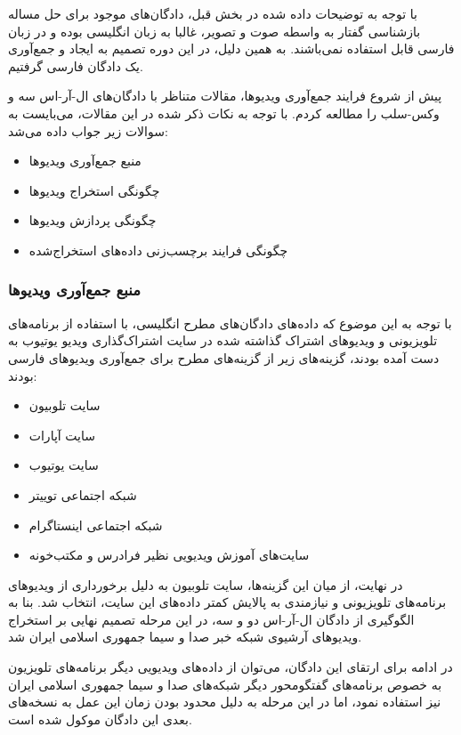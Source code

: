 با توجه به توضیحات داده شده در بخش قبل، دادگان‌های موجود برای حل مساله بازشناسی گفتار به واسطه صوت و تصویر، غالبا به زبان انگلیسی بوده و در زبان فارسی قابل استفاده نمی‌باشند. به همین دلیل، در این دوره تصمیم به ایجاد و جمع‌آوری یک دادگان فارسی گرفتیم.

پیش از شروع فرایند جمع‌آوری ویدیو‌ها، مقالات متناظر با دادگان‌های ال-آر-اس سه و وکس-سلب را مطالعه کردم. با توجه به نکات ذکر شده در این مقالات، می‌بایست به سوالات زیر جواب داده می‌شد:

\begin{itemize}
	\item منبع جمع‌آوری ویدیو‌ها
	\item چگونگی استخراج ویدیو‌ها
	\item چگونگی پردازش ویدیو‌ها
	\item چگونگی فرایند برچسب‌زنی داده‌های استخراج‌شده
\end{itemize}

\subsubsection{منبع جمع‌آوری ویدیو‌ها}

با توجه به این موضوع که داده‌های دادگان‌های مطرح انگلیسی، با استفاده از برنامه‌های تلویزیونی و ویدیو‌های اشتراک گذاشته شده در سایت اشتراک‌گذاری ویدیو یوتیوب به دست آمده بودند، گزینه‌های زیر از گزینه‌های مطرح برای جمع‌آوری ویدیو‌های فارسی بودند:

\begin{itemize}
	\item سایت تلوبیون
	\item سایت آپارات
	\item سایت یوتیوب
	\item شبکه اجتماعی توییتر
	\item شبکه اجتماعی اینستاگرام
	\item سایت‌های آموزش ویدیویی نظیر فرادرس و مکتب‌خونه
\end{itemize}

در نهایت، از میان این گزینه‌ها، سایت تلوبیون به دلیل برخورداری از ویدیو‌های برنامه‌های تلویزیونی و نیازمندی به پالایش کمتر داده‌های این سایت، انتخاب شد. بنا به الگوگیری از دادگان ال-آر-اس دو و سه، در این مرحله تصمیم نهایی بر استخراج ویدیو‌های آرشیوی شبکه خبر صدا و سیما جمهوری اسلامی ایران شد.

در ادامه برای ارتقای این دادگان، می‌توان از داده‌های ویدیویی دیگر برنامه‌های تلویزیون به خصوص برنامه‌های گفتگومحور دیگر شبکه‌های صدا و سیما جمهوری اسلامی ایران نیز استفاده نمود، اما در این مرحله به دلیل محدود بودن زمان این عمل به نسخه‌های بعدی این دادگان موکول شده است.

